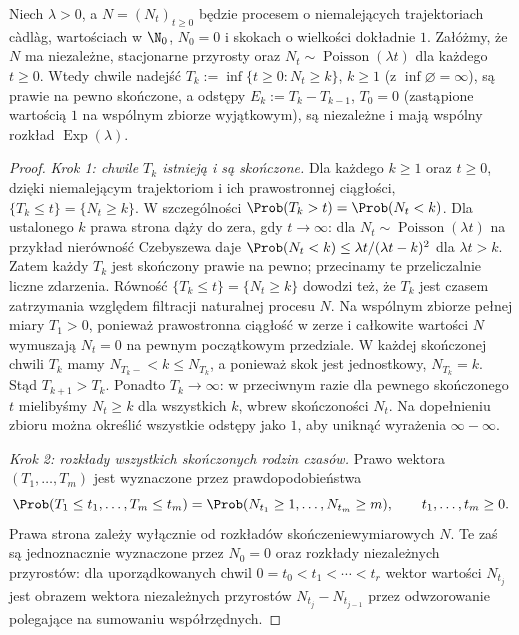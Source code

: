 \begin{twierdzenie}
\label{thm:poisson-reverse}
Niech $\lambda>0$, a $N=(N_t)_{t\ge0}$ będzie procesem
o niemalejących trajektoriach c\`adl\`ag, wartościach
w $\N_0$, $N_0=0$ i skokach o wielkości dokładnie $1$.
Załóżmy, że $N$ ma niezależne, stacjonarne przyrosty
oraz $N_t\sim\operatorname{Poisson}(\lambda t)$ dla każdego
$t\ge0$. Wtedy chwile nadejść
$T_k:=\inf\{t\ge0:N_t\ge k\}$, $k\ge1$
(z $\inf\varnothing=\infty$),
są prawie na pewno skończone, a odstępy
$E_k:=T_k-T_{k-1}$, $T_0=0$ (zastąpione wartością $1$
na wspólnym zbiorze wyjątkowym), są niezależne i mają
wspólny rozkład $\operatorname{Exp}(\lambda)$.
\end{twierdzenie}
\begin{proof}
\emph{Krok 1: chwile $T_k$ istnieją i są skończone.}
Dla każdego $k\ge1$ oraz $t\ge0$, dzięki niemalejącym
trajektoriom i ich prawostronnej ciągłości,
$\{T_k\le t\}=\{N_t\ge k\}$.
W szczególności $\Prob(T_k>t)=\Prob(N_t<k)$.
Dla ustalonego $k$ prawa strona dąży do zera, gdy
$t\to\infty$: dla $N_t\sim\operatorname{Poisson}(\lambda t)$
na przykład nierówność Czebyszewa daje
$\Prob(N_t<k)\le\lambda t/(\lambda t-k)^2$
dla $\lambda t>k$.
Zatem każdy $T_k$ jest skończony prawie na pewno;
przecinamy te przeliczalnie liczne zdarzenia.
Równość $\{T_k\le t\}=\{N_t\ge k\}$ dowodzi też,
że $T_k$ jest czasem zatrzymania względem filtracji
naturalnej procesu $N$. Na wspólnym zbiorze pełnej miary
$T_1>0$, ponieważ prawostronna ciągłość w zerze
i całkowite wartości $N$ wymuszają $N_t=0$ na pewnym
początkowym przedziale. W każdej skończonej chwili
$T_k$ mamy $N_{T_k-}<k\le N_{T_k}$, a ponieważ skok
jest jednostkowy, $N_{T_k}=k$. Stąd $T_{k+1}>T_k$. Ponadto $T_k\to\infty$: w przeciwnym razie
dla pewnego skończonego $t$ mielibyśmy $N_t\ge k$
dla wszystkich $k$, wbrew skończoności $N_t$.
Na dopełnieniu zbioru można określić wszystkie odstępy
jako $1$, aby uniknąć wyrażenia $\infty-\infty$.

\emph{Krok 2: rozkłady wszystkich skończonych rodzin czasów.}
Prawo wektora $(T_1,\ldots,T_m)$ jest wyznaczone
przez prawdopodobieństwa
\[
\Prob(T_1\le t_1,\ldots,T_m\le t_m)
=\Prob(N_{t_1}\ge1,\ldots,N_{t_m}\ge m),
\qquad t_1,\ldots,t_m\ge0.
\]
Prawa strona zależy wyłącznie od rozkładów
skończeniewymiarowych $N$. Te zaś są jednoznacznie
wyznaczone przez $N_0=0$ oraz rozkłady niezależnych
przyrostów: dla uporządkowanych chwil $0=t_0<t_1<\cdots<t_r$
wektor wartości $N_{t_j}$ jest obrazem wektora
niezależnych przyrostów $N_{t_j}-N_{t_{j-1}}$ przez
odwzorowanie polegające na sumowaniu współrzędnych.


\end{proof}
